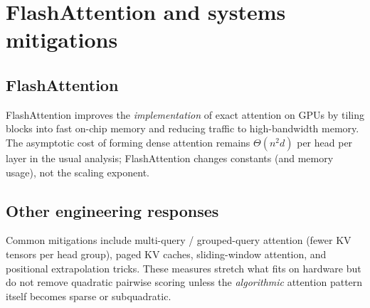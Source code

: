 \chapter{FlashAttention and systems mitigations}

\section{FlashAttention}

FlashAttention \cite{dao2022flashattention} improves the \emph{implementation} of exact attention on GPUs by
tiling blocks into fast on-chip memory and reducing traffic to high-bandwidth memory. The asymptotic cost of
forming dense attention remains $\Theta(n^2 d)$ per head per layer in the usual analysis; FlashAttention changes
constants (and memory usage), not the scaling exponent.

\section{Other engineering responses}

Common mitigations include multi-query / grouped-query attention (fewer KV tensors per head group),
paged KV caches, sliding-window attention, and positional extrapolation tricks. These measures stretch
what fits on hardware but do not remove quadratic pairwise scoring unless the \emph{algorithmic}
attention pattern itself becomes sparse or subquadratic.
